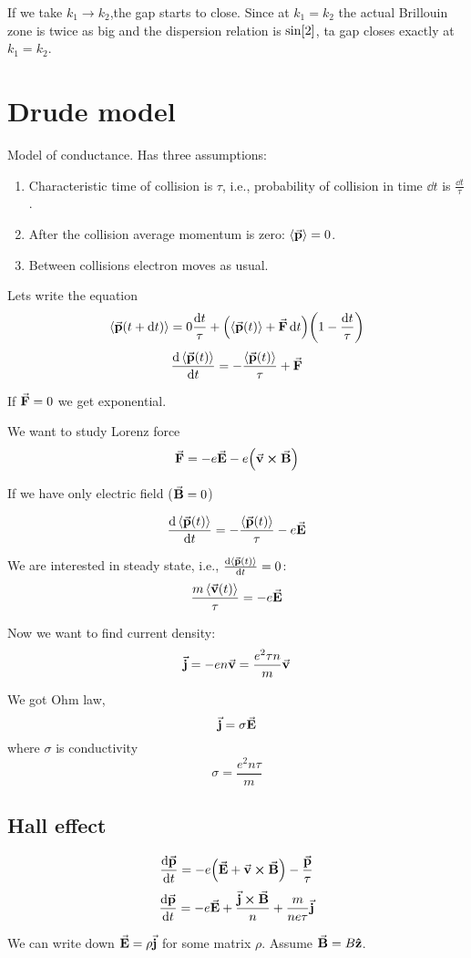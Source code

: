 If we take $k_1\to k_2$,the gap starts to close. Since at $k_1=k_2$ the actual Brillouin zone is twice as big and the dispersion relation is $\sine[2]$, ta gap closes exactly at $k_1=k_2$.

\section{Drude model}
Model of conductance. Has three assumptions:
\begin{enumerate}
	\item Characteristic time of collision is $\tau$, i.e., probability of collision in time $\dd{t}$ is $\frac{\dd{t}}{\tau}$.
	\item After the collision average momentum is zero: $\expval{\va{p}} = 0$.
	\item Between collisions electron moves as usual.
\end{enumerate}

Lets write the equation
$$\expval{\va{p}(t+\dd{t}) } = 0\frac{\dd{t}}{\tau} + \qty(\expval{\va{p}(t)} + \va{F}\dd{t})\qty(1-\frac{\dd{t}}{\tau})$$
$$\dv{\expval{\va{p}(t)}}{t} = -\frac{\expval{\va{p}(t)}}{\tau} +\va{F}$$

If $\va{F} = 0$ we get exponential.

We want to study Lorenz force
$$\va{F}= -e\va{E} - e\qty(\va{v} \cross \va{B})$$

If we have only electric field ($\va{B}=0$)

$$\dv{\expval{\va{p}(t)}}{t} = -\frac{\expval{\va{p}(t)}}{\tau} - e\va{E}$$

We are interested in steady state, i.e., $\dv{\expval{\va{p}(t)}}{t} = 0$:
$$\frac{m\expval{\va{v}(t)}}{\tau} = - e\va{E}$$

Now we want to find current density:
 $$\va{j} = -en\va{v} = \frac{e^2 \tau n}{m} \va{v}$$
 
 We got Ohm law,
 $$\va{j} = \sigma \va{E}$$
 where $\sigma$ is conductivity
 $$\sigma = \frac{e^2n\tau}{m}$$
 
 \subsection{Hall effect}
 $$\dv{\va{p}}{t} = -e\qty(\va{E} + \va{v} \cross \va{B}) -\frac{\va{p}}{\tau}$$
 $$\dv{\va{p}}{t} = -e\va{E} +\frac{ \va{j} \cross \va{B} }{n}+\frac{m}{ne\tau} \va{j}$$
 
 We can write down $\va{E} = \rho \va{j}$ for some matrix $\rho$. Assume $\va{B} = B\vu{z}$.
 

